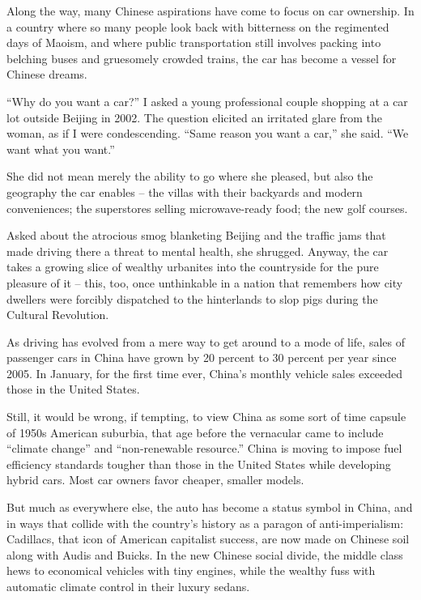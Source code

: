 \documentclass[12pt,a4paper,onecolumn]{article}
\begin{document}
Along the way, many Chinese aspirations have come to focus on car ownership. In a country where so
many people look back with bitterness on the regimented days of Maoism, and where public
transportation still involves packing into belching buses and gruesomely crowded trains, the car has
become a vessel for Chinese dreams.

``Why do you want a car?'' I asked a young professional couple shopping at a car lot outside Beijing
in 2002. The question elicited an irritated glare from the woman, as if I were condescending. ``Same
reason you want a car,'' she said. ``We want what you want.''

She did not mean merely the ability to go where she pleased, but also the geography the car enables
-- the villas with their backyards and modern conveniences; the superstores selling microwave-ready
food; the new golf courses.

Asked about the atrocious smog blanketing Beijing and the traffic jams that made driving there a
threat to mental health, she shrugged. Anyway, the car takes a growing slice of wealthy urbanites
into the countryside for the pure pleasure of it -- this, too, once unthinkable in a nation that
remembers how city dwellers were forcibly dispatched to the hinterlands to slop pigs during the
Cultural Revolution.

As driving has evolved from a mere way to get around to a mode of life, sales of passenger cars in
China have grown by 20 percent to 30 percent per year since 2005. In January, for the first time
ever, China's monthly vehicle sales exceeded those in the United States.

Still, it would be wrong, if tempting, to view China as some sort of time capsule of 1950s American
suburbia, that age before the vernacular came to include ``climate change'' and ``non-renewable
resource.'' China is moving to impose fuel efficiency standards tougher than those in the United
States while developing hybrid cars. Most car owners favor cheaper, smaller models.

But much as everywhere else, the auto has become a status symbol in China, and in ways that collide
with the country's history as a paragon of anti-imperialism: Cadillacs, that icon of American capitalist success, are now made on Chinese soil along with Audis and Buicks. In the new Chinese social divide, the middle class hews to economical vehicles with tiny engines, while the wealthy fuss with automatic climate control in their luxury sedans.
\end{document}
